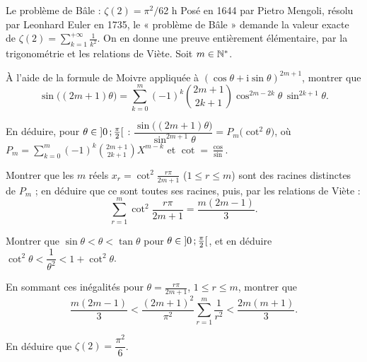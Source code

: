 

\begin{defi}{Le problème de Bâle : $\zeta(2)=\pi^{2}/6$}{2 h}
Posé en 1644 par Pietro Mengoli, résolu par Leonhard Euler en 1735, le
« problème de Bâle » demande la valeur exacte de
$\zeta(2)=\displaystyle\sum_{k=1}^{+\infty}\frac{1}{k^{2}}$. On en donne une
preuve entièrement élémentaire, par la trigonométrie et les relations de
Viète. Soit $m\in\mathbb{N}^{*}$.

\begin{questions}
  \item À l'aide de la formule de Moivre appliquée à
    $(\cos\theta+\mathrm{i}\sin\theta)^{2m+1}$, montrer que
    \[
    \sin\bigl((2m+1)\theta\bigr)=\sum_{k=0}^{m}(-1)^{k}\binom{2m+1}{2k+1}
    \cos^{2m-2k}\theta\,\sin^{2k+1}\theta .
    \]
  \item En déduire, pour $\theta\in\mathopen{]}0\,{;}\,\frac\pi2\mathclose{[}$ :
    $\dfrac{\sin\bigl((2m+1)\theta\bigr)}{\sin^{2m+1}\theta}=P_m\bigl(\cot^{2}\theta\bigr)$,
    où $P_m=\sum_{k=0}^{m}(-1)^{k}\binom{2m+1}{2k+1}X^{m-k}$ et
    $\cot=\frac{\cos}{\sin}$.
  \item Montrer que les $m$ réels $x_r=\cot^{2}\frac{r\pi}{2m+1}$
    ($1\leqslant r\leqslant m$) sont des racines distinctes de $P_m$ ; en
    déduire que ce sont toutes ses racines, puis, par les relations de
    Viète :
    \[
    \sum_{r=1}^{m}\cot^{2}\frac{r\pi}{2m+1}=\frac{m(2m-1)}{3} .
    \]
\end{questions}

\begin{questions}[resume]
  \item Montrer que $\sin\theta<\theta<\tan\theta$ pour
    $\theta\in\mathopen{]}0\,{;}\,\frac\pi2\mathclose{[}$, et en déduire
    $\cot^{2}\theta<\dfrac{1}{\theta^{2}}<1+\cot^{2}\theta$.
  \item En sommant ces inégalités pour $\theta=\frac{r\pi}{2m+1}$,
    $1\leqslant r\leqslant m$, montrer que
    \[
    \frac{m(2m-1)}{3}<\frac{(2m+1)^{2}}{\pi^{2}}\sum_{r=1}^{m}\frac{1}{r^{2}}
    <\frac{2m(m+1)}{3} .
    \]
  \item En déduire que $\zeta(2)=\dfrac{\pi^{2}}{6}$.
\end{questions}


\end{defi}
